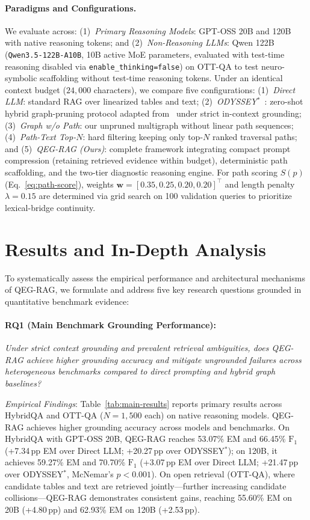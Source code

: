 \documentclass[runningheads]{llncs}
\begin{document}
\paragraph{Paradigms and Configurations.}
We evaluate across: (1)~\emph{Primary Reasoning Models}: GPT-OSS 20B and 120B with native reasoning tokens; and (2)~\emph{Non-Reasoning LLMs}: Qwen 122B (\texttt{Qwen3.5-122B-A10B}, 10B active MoE parameters, evaluated with test-time reasoning disabled via \texttt{enable\_thinking=false}) on OTT-QA to test neuro-symbolic scaffolding without test-time reasoning tokens.
Under an identical context budget ($24{,}000$ characters), we compare five configurations:
(1)~\emph{Direct LLM}: standard RAG over linearized tables and text;
(2)~\emph{ODYSSEY$^*$}~\cite{agarwal2025hybrid}: zero-shot hybrid graph-pruning protocol adapted from~\cite{agarwal2025hybrid} under strict in-context grounding;
(3)~\emph{Graph w/o Path}: our unpruned multigraph without linear path sequences;
(4)~\emph{Path-Text Top-$N$}: hard filtering keeping only top-$N$ ranked traversal paths; and
(5)~\emph{QEG-RAG (Ours)}: complete framework integrating compact prompt compression (retaining retrieved evidence within budget), deterministic path scaffolding, and the two-tier diagnostic reasoning engine. For path scoring $S(p)$ (Eq.~\ref{eq:path-score}), weights $\mathbf{w} = [0.35, 0.25, 0.20, 0.20]^\top$ and length penalty $\lambda = 0.15$ are determined via grid search on 100 validation queries to prioritize lexical-bridge continuity.

\section{Results and In-Depth Analysis}
\label{sec:results}
\enlargethispage{4.5\baselineskip}
To systematically assess the empirical performance and architectural mechanisms of QEG-RAG, we formulate and address five key research questions grounded in quantitative benchmark evidence:

\paragraph{RQ1 (Main Benchmark Grounding Performance):}
\emph{Under strict context grounding and prevalent retrieval ambiguities, does QEG-RAG achieve higher grounding accuracy and mitigate ungrounded failures across heterogeneous benchmarks compared to direct prompting and hybrid graph baselines?}

\emph{Empirical Findings}: Table~\ref{tab:main-results} reports primary results across HybridQA and OTT-QA ($N=1{,}500$ each) on native reasoning models. QEG-RAG achieves higher grounding accuracy across models and benchmarks. On HybridQA with GPT-OSS 20B, QEG-RAG reaches 53.07\% EM and 66.45\% $\text{F}_1$ (+7.34\,pp EM over Direct LLM; +20.27\,pp over ODYSSEY$^*$); on 120B, it achieves 59.27\% EM and 70.70\% $\text{F}_1$ (+3.07\,pp EM over Direct LLM; +21.47\,pp over ODYSSEY$^*$, McNemar's $p < 0.001$). On open retrieval (OTT-QA), where candidate tables and text are retrieved jointly---further increasing candidate collisions---QEG-RAG demonstrates consistent gains, reaching 55.60\% EM on 20B (+4.80\,pp) and 62.93\% EM on 120B (+2.53\,pp).
\end{document}
